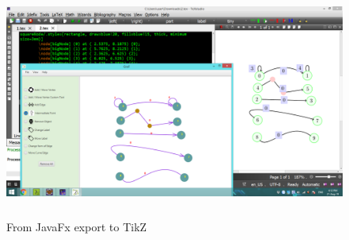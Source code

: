 \documentclass[a4paper,10pt]{article}
\begin{document}
\paragraph{}
\begin{figure}[H]
	\centering
	\includegraphics[height = 3in]{ImageFinal.png}
	\caption[Optional caption]{From JavaFx export to TikZ}
	\label{fig:Repository}
\end{figure}
\paragraph{}
\newpage
{}
\printbibliography
\end{document}

